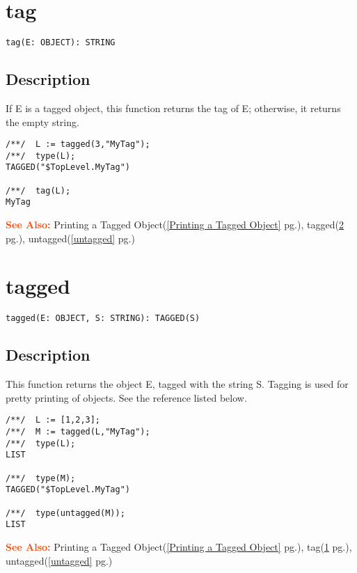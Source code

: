 \documentclass[a4paper]{mybook}
\newenvironment{command}{}{} %
\newcommand\SeeAlso{\par\textcolor{OrangeRed}{\textbf{\large See Also: }}}
\begin{document}
\section{tag}
\label{tag}
\begin{command} %


\begin{Verbatim}[label=syntax, rulecolor=\color{MidnightBlue},
frame=single]
tag(E: OBJECT): STRING
\end{Verbatim}


\subsection*{Description}

If E is a tagged object, this function returns the tag of E;
otherwise, it returns the empty string.
\begin{Verbatim}[label=example, rulecolor=\color{PineGreen}, frame=single]
/**/  L := tagged(3,"MyTag");
/**/  type(L);
TAGGED("$TopLevel.MyTag")

/**/  tag(L);
MyTag
\end{Verbatim}


\SeeAlso %
  Printing a Tagged Object(\ref{Printing a Tagged Object} pg.\pageref{Printing a Tagged Object}), 
    tagged(\ref{tagged} pg.\pageref{tagged}), 
    untagged(\ref{untagged} pg.\pageref{untagged})
\end{command} %

\section{tagged}
\label{tagged}
\begin{command} %


\begin{Verbatim}[label=syntax, rulecolor=\color{MidnightBlue},
frame=single]
tagged(E: OBJECT, S: STRING): TAGGED(S)
\end{Verbatim}


\subsection*{Description}

This function returns the object E, tagged with the string S.
Tagging is used for pretty printing of objects.  See the reference
listed below.
\begin{Verbatim}[label=example, rulecolor=\color{PineGreen}, frame=single]
/**/  L := [1,2,3];
/**/  M := tagged(L,"MyTag");
/**/  type(L);
LIST

/**/  type(M);
TAGGED("$TopLevel.MyTag")

/**/  type(untagged(M));
LIST
\end{Verbatim}


\SeeAlso %
  Printing a Tagged Object(\ref{Printing a Tagged Object} pg.\pageref{Printing a Tagged Object}), 
    tag(\ref{tag} pg.\pageref{tag}), 
    untagged(\ref{untagged} pg.\pageref{untagged})
\end{command} %
\end{document}
